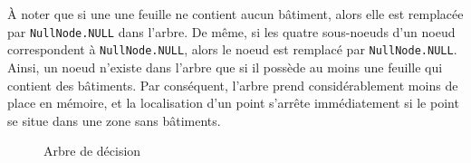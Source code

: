 \`{A} noter que si une une feuille ne contient aucun bâtiment, alors elle est remplacée par \texttt{NullNode.NULL} dans l'arbre. De même, si les quatre sous-noeuds d'un noeud correspondent à \texttt{NullNode.NULL}, alors le noeud est remplacé par \texttt{NullNode.NULL}. Ainsi, un noeud n'existe dans l'arbre que si il possède au moins une feuille qui contient des bâtiments. Par conséquent, l'arbre prend considérablement moins de place en mémoire, et la localisation d'un point s'arrête immédiatement si le point se situe dans une zone sans bâtiments.

\begin{figure}[h!]
\centering
{}
\label{fig:ArbreDecision}
\caption{Arbre de décision}
\end{figure}
